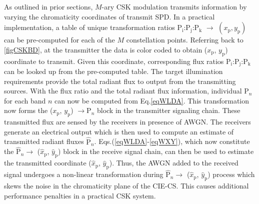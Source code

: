 As outlined in prior sections, $M$-ary CSK modulation transmits information by varying the chromaticity coordinates of transmit SPD. In a practical implementation, a table of unique transformation ratios P$_{\text{i}}$:P$_{\text{j}}$:P$_{\text{k}}$ $\rightarrow$ $(x_{\text{p}},y_{\text{p}})$ can be pre-computed for each of the $M$ constellation points. Referring back to \figurename{ }\ref{figCSKBD}, at the transmitter the data is color coded to obtain ($x_{\text{p}}$, $y_{\text{p}}$) coordinate to transmit. Given this coordinate, corresponding flux ratios P$_{\text{i}}$:P$_{\text{j}}$:P$_{\text{k}}$ can be looked up from the pre-computed table. The target illumination requirements provide the total radiant flux to output from the transmitting sources. With the flux ratio and the total radiant flux information, individual P$_{n}$ for each band $n$ can now be computed from Eq.\eqref{eqWLDA}. This transformation now forms the ($x_{\text{p}}$, $y_{\text{p}}$) $\rightarrow  \text{P}_{n}$ block in the transmitter signaling chain. These transmitted flux are sensed by the receivers in presence of AWGN. The receivers generate an electrical output which is then used to compute an estimate of transmitted radiant fluxes $\hat{\text{P}}_{n}$. Eqs.(\ref{eqWLDA}-\ref{eqWXY}), which now constitute the $\hat{\text{P}}_{n}\rightarrow$ ($\hat{x}_{\text{p}}$, $\hat{y}_{\text{p}}$) block in the receive signal chain, can then be used to estimate the transmitted coordinate ($\hat{x}_{\text{p}}$, $\hat{y}_{\text{p}}$). Thus, the AWGN added to the received signal undergoes a non-linear transformation during $\hat{\text{P}}_{n}\rightarrow$ ($\hat{x}_{\text{p}}$, $\hat{y}_{\text{p}}$) process which skews the noise in the chromaticity plane of the CIE-CS. This causes additional performance penalties in a practical CSK system.


